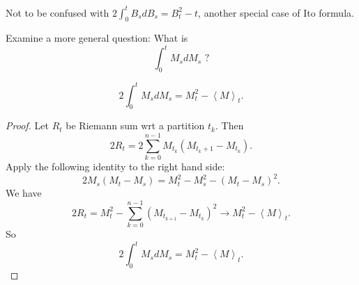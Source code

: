 Not to be confused with $2 \int _0^t B_s d B_s = B_t^2 - t$, another special case of Ito formula.

Examine a more general question: What is 
\[
	\int _0^t M_s d M_s \text{ ?}
\] 
\begin{claim}
	\[
	2 \int _0^t M_s d M_s = M_t^2 - \left\langle M \right\rangle _t
.\]
\end{claim}
\begin{proof}
	Let $R_t$ be Riemann sum wrt a partition $t_k$. Then
\[
	2 R_t = 2 \sum_{k = 0}^{n - 1} M_{t_k} \left( M_{t_k+1} - M_{t_k} \right) 
.\] 
Apply the following identity to the right hand side:
\[
	2 M_s (M_t - M_s) = M_t^2 - M_s^2 - (M_t - M_s)^2
.\] 
We have
\[
	2 R_t = M_t^2 - \sum_{k = 0}^{n - 1} \left( M_{t_{k+1}} - M_{t_k} \right)^2  
	\to  M_t^2 - \left\langle M \right\rangle _t
.\] 
So
\[
	2 \int _0^t M_s d M_s = M_t^2 - \left\langle M \right\rangle _t
.\] 
\end{proof}

